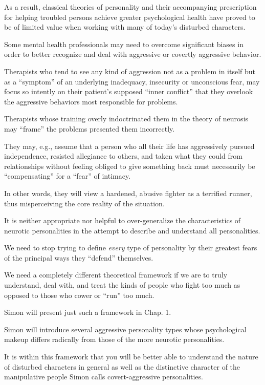 \documentclass[oneside]{book}
\numberwithin{equation}{section}
\begin{document}
As a result, classical theories of personality and their accompanying prescription for helping troubled persons achieve greater psychological health have proved to be of limited value when working with many of today's disturbed characters.

%
Some mental health professionals may need to overcome significant biases in order to better recognize and deal with aggressive or covertly aggressive behavior.

Therapists who tend to see any kind of aggression not as a problem in itself but as a ``symptom'' of an underlying inadequacy, insecurity or unconscious fear, may focus so intently on their patient's supposed ``inner conflict'' that they overlook the aggressive behaviors most responsible for problems.

Therapists whose training overly indoctrinated them in the theory of neurosis may ``frame'' the problems presented them incorrectly.

They may, e.g., assume that a person who all their life has aggressively pursued independence, resisted allegiance to others, and taken what they could from relationships without feeling obliged to give something back must necessarily be ``compensating'' for a ``fear'' of intimacy.

In other words, they will view a hardened, abusive fighter as a terrified runner, thus misperceiving the core reality of the situation.

%
It is neither appropriate nor helpful to over-generalize the characteristics of neurotic personalities in the attempt to describe and understand all personalities.

We need to stop trying to define \textit{every} type of personality by their greatest fears of the principal ways they ``defend'' themselves.

We need a completely different theoretical framework if we are to truly understand, deal with, and treat the kinds of people who fight too much as opposed to those who cower or ``run'' too much.

Simon will present just such a framework in Chap. 1.

Simon will introduce several aggressive personality types whose psychological makeup differs radically from those of the more neurotic personalities.

It is within this framework that you will be better able to understand the nature of disturbed characters in general as well as the distinctive character of the manipulative people Simon calls covert-aggressive personalities.
\end{document}
